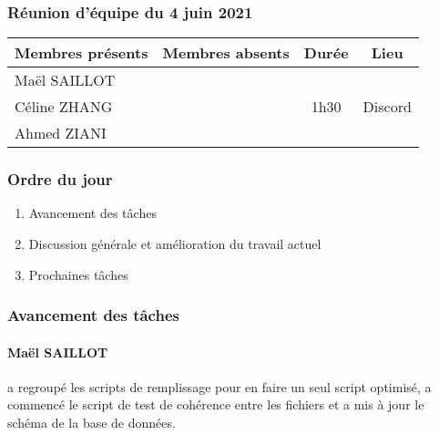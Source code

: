 


% 
\subsubsection*{\large{Réunion d'équipe du 4 juin 2021}}
\begin{center}
\begin{tabular}{| l | l || c | c |}
    \hline
    Membres présents & Membres absents & Durée & Lieu \\
    \hline
    Maël SAILLOT & & & \\ Céline ZHANG & & 1h30 & Discord \\ Ahmed ZIANI & & & \\
    \hline
\end{tabular}
\end{center}

\subsubsection*{Ordre du jour}
\begin{enumerate}
    \item Avancement des tâches
    \item Discussion générale et amélioration du travail actuel
    \item Prochaines tâches
\end{enumerate}

\subsubsection*{Avancement des tâches}
\paragraph{Maël SAILLOT} a regroupé les scripts de remplissage pour en faire un seul script optimisé, a commencé le script de test de cohérence entre les fichiers et a mis à jour le schéma de la base de données.
